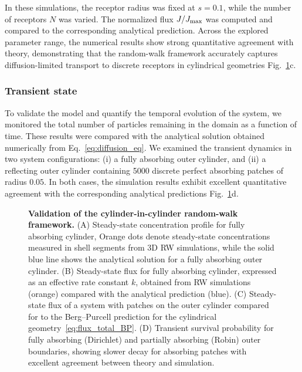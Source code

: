 In these simulations, the receptor radius was fixed at $s = 0.1$, while the number of receptors $N$ was varied.
The normalized flux $J/J_{\mathrm{max}}$ was computed and compared to the corresponding analytical prediction.
Across the explored parameter range, the numerical results show strong quantitative agreement with theory, demonstrating that the random-walk framework accurately captures diffusion-limited transport to discrete receptors in cylindrical geometries Fig.~\ref{fig:rw_validation}c.

\subsubsection{Transient state}\label{sec:rw_transient}
To validate the model and quantify the temporal evolution of the system, we monitored the total number of particles remaining in the domain as a function of time.
These results were compared with the analytical solution obtained numerically from Eq.~\eqref{eq:diffusion_eq}.
We examined the transient dynamics in two system configurations: (i) a fully absorbing outer cylinder, and (ii) a reflecting outer cylinder containing 5000 discrete perfect absorbing patches of radius $0.05$.
In both cases, the simulation results exhibit excellent quantitative agreement with the corresponding analytical predictions Fig.~\ref{fig:rw_validation}d.

\begin{figure}[H]
    \centering
    \caption{\textbf{Validation of the cylinder-in-cylinder random-walk framework.} (A) Steady-state concentration profile for fully absorbing cylinder, Orange dots denote steady-state concentrations measured in shell segments from 3D RW simulations, while the solid blue line shows the analytical solution for a fully absorbing outer cylinder. (B) Steady-state flux for fully absorbing cylinder, expressed as an effective rate constant $k$, obtained from RW simulations (orange) compared with the analytical prediction (blue). (C) Steady-state flux of a system with patches on the outer cylinder compared for to the Berg--Purcell prediction for the cylindrical geometry~\eqref{eq:flux_total_BP}. (D) Transient survival probability for fully absorbing (Dirichlet) and partially absorbing (Robin) outer boundaries, showing slower decay for absorbing patches with excellent agreement between theory and simulation.}
    \label{fig:rw_validation}
\end{figure}

